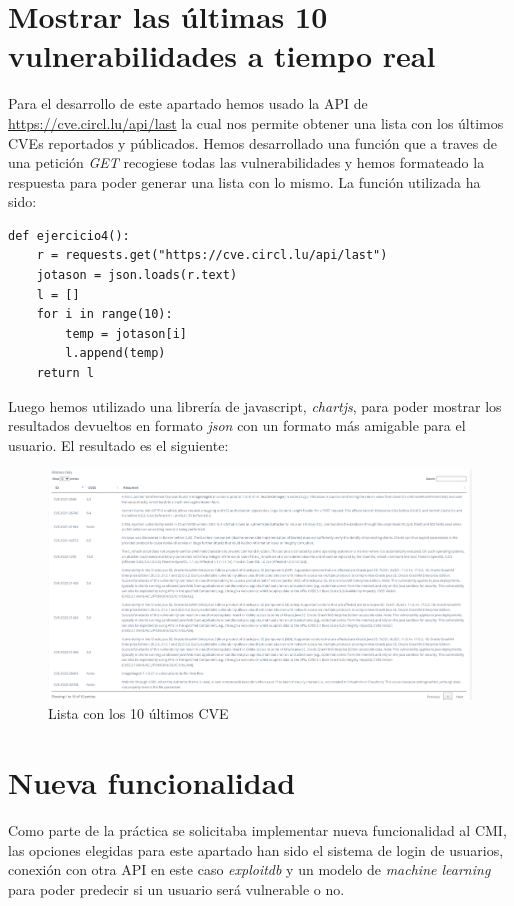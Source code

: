\documentclass[12pt, a4paper,twoside,titlepage]{article}
\begin{document}
\section{Mostrar las últimas 10 vulnerabilidades a tiempo real}
Para el desarrollo de este apartado hemos usado la API de \url{https://cve.circl.lu/api/last} la cual nos permite obtener una lista con los últimos CVEs reportados y públicados. Hemos desarrollado una función que a traves de una petición \emph{GET} recogiese todas las vulnerabilidades y hemos formateado la respuesta para poder generar una lista con lo mismo. La función utilizada ha sido:
\begin{verbatim}
def ejercicio4():
    r = requests.get("https://cve.circl.lu/api/last")
    jotason = json.loads(r.text)
    l = []
    for i in range(10):
        temp = jotason[i]
        l.append(temp)
    return l
\end{verbatim}
Luego hemos utilizado una librería de javascript, \emph{chartjs}, para poder mostrar los resultados devueltos en formato \emph{json} con un formato más amigable para el usuario. 
El resultado es el siguiente:
\begin{figure}[H]
    \centering
    \includegraphics[width=1\linewidth]{Figuras/cve-list.png}
    \caption{Lista con los 10 últimos CVE}
    \label{fig:cvelist}
\end{figure}
\section{Nueva funcionalidad}
Como parte de la práctica se solicitaba implementar nueva funcionalidad al CMI, las opciones elegidas para este apartado han sido el sistema de login de usuarios, conexión con otra API en este caso \emph{exploitdb} y un modelo de \emph{machine learning} para poder predecir si un usuario será vulnerable o no.
\end{document}
